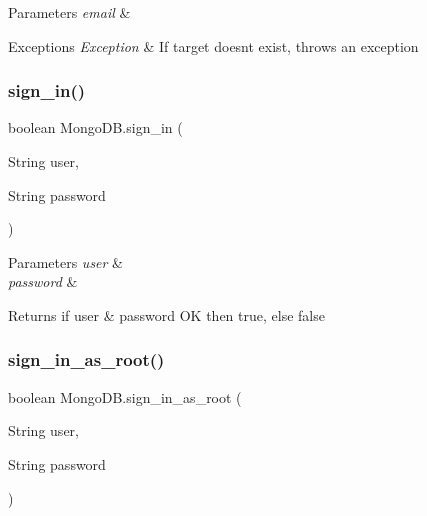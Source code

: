 \begin{DoxyParams}{Parameters}
{\em email} & \\
\hline
\end{DoxyParams}

\begin{DoxyExceptions}{Exceptions}
{\em Exception} & If target doesn\textquotesingle{}t exist, throws an exception \\
\hline
\end{DoxyExceptions}
\mbox{\label{class_mongo_d_b_a672df0039a1fcd302bd399089bb7fe28}} 
\subsubsection{\texorpdfstring{sign\+\_\+in()}{sign\_in()}}
{\footnotesize\ttfamily boolean Mongo\+D\+B.\+sign\+\_\+in (\begin{DoxyParamCaption}\item[{String}]{user,  }\item[{String}]{password }\end{DoxyParamCaption})}


\begin{DoxyParams}{Parameters}
{\em user} & \\
\hline
{\em password} & \\
\hline
\end{DoxyParams}
\begin{DoxyReturn}{Returns}
if user \& password OK then true, else false 
\end{DoxyReturn}
\mbox{\label{class_mongo_d_b_afa13d12f56548fcf6c5ca12ec66bc73c}} 
\subsubsection{\texorpdfstring{sign\+\_\+in\+\_\+as\+\_\+root()}{sign\_in\_as\_root()}}
{\footnotesize\ttfamily boolean Mongo\+D\+B.\+sign\+\_\+in\+\_\+as\+\_\+root (\begin{DoxyParamCaption}\item[{String}]{user,  }\item[{String}]{password }\end{DoxyParamCaption})}



